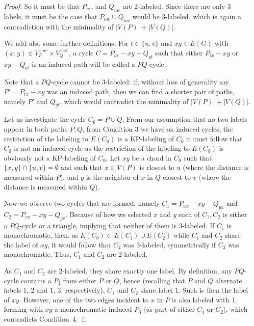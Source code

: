 \documentclass[12pt,a4paper,titlepage,openany]{report}
\begin{document}
\begin{proof}
So it must be that $P_{uw}$ and $Q_{uw}$ are 2-labeled. Since there are only 3 labels, it must be the case that $P_{uw}\cup Q_{uw}$ would be 3-labeled, which is again a contradiction with the minimality of $|V(P)|+|V(Q)|$.

We add also some further definitions. For $t \in \{u, v\}$ and $xy \in E(G)$ with $(x, y) \in V_P^{-uv} \times V_Q^{-uv}$, a cycle $C = P_{tx}-xy-Q_{yt}$ such that either $P_{tx}-xy$ or $xy-Q_{yt}$ is an induced path will be called a $PQ$-cycle.

Note that a $P Q$-cycle cannot be 3-labeled: if, without loss of generality say $P' = P_{tx} -xy$ was an induced path, then we can find a shorter pair of paths, namely $P'$ and $Q_{yt}$, which would contradict the minimality of $|V(P)|+|V(Q)|$.

Let us investigate the cycle $C_0=P\cup Q$. From our assumption that no two labels appear in both paths $P,Q$, from Condition 3 we have on induced cycles, the restriction of the labeling to $E(C_0)$ is a KP-labeling of $C_0$ it must follow that $C_0$ is not an induced cycle as the restriction of the labeling to $E(C_0)$ is obviously not a KP-labeling of $C_0$. Let $xy$ be a chord in $C_0$ such that $\{x, y\} \cap \{u, v\} = \emptyset$ and such that $x \in V (P )$ is closest to $u$ (where the distance is measured within $P$), and $y$ is the neighbor of $x$ in $Q$ closest to $v$ (where the distance is measured within $Q$).

 Now we observe two cycles that are formed, namely $C_1 = P_{ux}-xy-Q_{yu}$ and $C_2 = P_{vx} -xy-Q_{yv}$. Because of how we selected $x$ and $y$ each of $C_1,C_2$ is either a $P Q$-cycle or a triangle, implying that neither of them is 3-labeled. If $C_1$ is monochromatic, then, as $E(C_0) \subset E(C_1 ) \cup E(C_2)$ while $C_1$ and $C_2$ share the label of $xy$, it would follow that $C_2$ was 3-labeled, symmetrically if $C_2$ was monochromatic. Thus, $C_1$ and $C_2$ are 2-labeled.

 As $C_1$ and $C_2$ are 2-labeled, they share exactly one label. By definition, any $P Q$-cycle contains a $P_3$ from either $P$ or $Q$, hence (recalling that $P$ and $Q$ alternate labels 1, 2 and 1, 3, respectively), $C_1$ and $C_2$ share label 1. Such is then the label of $xy$. However, one of the two edges incident to $x$ in $P$ is also labeled with 1, forming with $xy$ a monochromatic
induced $P_3$ (as part of either $C_1$ or $C_2$), which contradicts Condition~4.
\end{proof}
\end{document}
